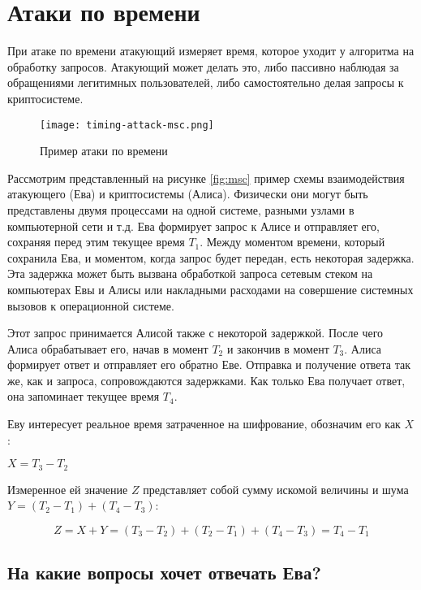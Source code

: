 \section{Атаки по времени} \label{sec:timing}

При атаке по времени атакующий измеряет время, которое уходит у
алгоритма на обработку запросов. Атакующий может делать это, либо пассивно
наблюдая за обращениями легитимных пользователей, либо самостоятельно делая
запросы к криптосистеме.

\begin{figure}[h]
    \centering
    \texttt{[image: timing-attack-msc.png]}
    \caption{Пример атаки по времени}
\end{figure} \label{fig:msc}

Рассмотрим представленный на рисунке \ref{fig:msc} пример схемы взаимодействия атакующего (Ева)
и криптосистемы (Алиса). Физически они могут быть представлены двумя процессами на одной
системе, разными узлами в компьютерной сети и т.д. Ева формирует запрос
к Алисе и отправляет его, сохраняя перед этим текущее время $T_1$. Между
моментом времени, который сохранила Ева, и моментом, когда запрос будет передан,
есть некоторая задержка. Эта задержка может быть вызвана обработкой запроса
сетевым стеком на компьютерах Евы и Алисы или накладными расходами на совершение
системных вызовов к операционной системе.

Этот запрос принимается Алисой также с некоторой задержкой. После чего Алиса
обрабатывает его, начав в момент $T_2$ и закончив в момент $T_3$. Алиса
формирует ответ и отправляет его обратно Еве. Отправка и получение ответа так же,
как и запроса, сопровождаются задержками. Как только Ева получает ответ, она
запоминает текущее время $T_4$.

Еву интересует реальное время затраченное на шифрование, обозначим его как $X$ :

$X = T_3 - T_2$

Измеренное ей значение $Z$ представляет собой сумму искомой величины и шума
$Y = (T_2 - T_1) + (T_4 - T_3)$:

\begin{equation}
Z = X + Y = (T_3 - T_2) + (T_2 - T_1) + (T_4 - T_3) = T_4 - T_1
\end{equation} \label{eq:noise}

\subsection{На какие вопросы хочет отвечать Ева?}

